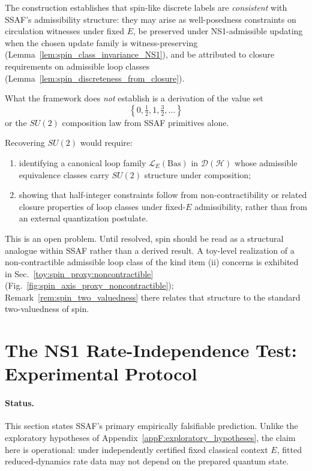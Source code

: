 \documentclass[aps,prx,onecolumn,11pt]{revtex4-2}
\theoremstyle{plain}
\theoremstyle{definition}
\theoremstyle{remark}
\begin{document}
The construction establishes that spin-like discrete labels are
\emph{consistent} with SSAF's admissibility structure: they may arise as
well-posedness constraints on circulation witnesses under fixed \(E\),
be preserved under NS1-admissible updating when the chosen update family
is witness-preserving
(Lemma~\ref{lem:spin_class_invariance_NS1}), and be attributed to
closure requirements on admissible loop classes
(Lemma~\ref{lem:spin_discreteness_from_closure}).

What the framework does \emph{not} establish is a derivation of the
value set
\[
\left\{0,\tfrac{1}{2},1,\tfrac{3}{2},\ldots\right\}
\]
or the \(SU(2)\) composition law from SSAF primitives alone.

Recovering \(SU(2)\) would require:
\begin{enumerate}[label=(\roman*), leftmargin=2.2em]
\item identifying a canonical loop family
\(\mathcal L_E(\mathrm{Bas})\) in \(\mathcal{D}(\mathcal H)\) whose
admissible equivalence classes carry \(SU(2)\) structure under
composition;
\item showing that half-integer constraints follow from
non-contractibility or related closure properties of loop classes under
fixed-\(E\) admissibility, rather than from an external quantization
postulate.
\end{enumerate}

This is an open problem. Until resolved, spin should be read as a
structural analogue within SSAF rather than a derived result. A
toy-level realization of a non-contractible admissible loop class of
the kind item (ii) concerns is exhibited in
Sec.~\ref{toy:spin_proxy:noncontractible}
(Fig.~\ref{fig:spin_axis_proxy_noncontractible});
Remark~\ref{rem:spin_two_valuedness} there relates that structure to
the standard two-valuedness of spin.

\section{The NS1 Rate-Independence Test: Experimental Protocol}
\label{subsec:resolution_scaling_hypothesis}

\paragraph{Status.}

This section states SSAF's primary empirically falsifiable
prediction. Unlike the exploratory hypotheses of
Appendix~\ref{appF:exploratory_hypotheses}, the claim here is
operational: under independently certified fixed classical context
\(E\), fitted reduced-dynamics rate data may not depend on the prepared
quantum state.
\end{document}

